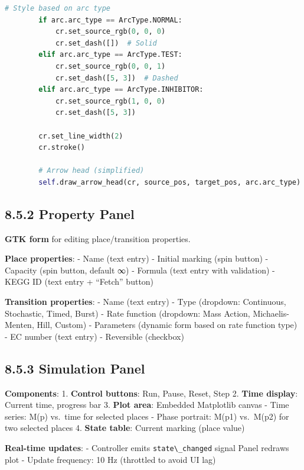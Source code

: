 \begin{lstlisting}[language=Python]
        # Style based on arc type
        if arc.arc_type == ArcType.NORMAL:
            cr.set_source_rgb(0, 0, 0)
            cr.set_dash([])  # Solid
        elif arc.arc_type == ArcType.TEST:
            cr.set_source_rgb(0, 0, 1)
            cr.set_dash([5, 3])  # Dashed
        elif arc.arc_type == ArcType.INHIBITOR:
            cr.set_source_rgb(1, 0, 0)
            cr.set_dash([5, 3])
        
        cr.set_line_width(2)
        cr.stroke()
        
        # Arrow head (simplified)
        self.draw_arrow_head(cr, source_pos, target_pos, arc.arc_type)
\end{lstlisting}

\hypertarget{property-panel}{%
\subsection{8.5.2 Property Panel}\label{property-panel}}

\textbf{GTK form} for editing place/transition properties.

\textbf{Place properties}: - Name (text entry) - Initial marking (spin
button) - Capacity (spin button, default ∞) - Formula (text entry with
validation) - KEGG ID (text entry + ``Fetch'' button)

\textbf{Transition properties}: - Name (text entry) - Type (dropdown:
Continuous, Stochastic, Timed, Burst) - Rate function (dropdown: Mass
Action, Michaelis-Menten, Hill, Custom) - Parameters (dynamic form based
on rate function type) - EC number (text entry) - Reversible (checkbox)

\hypertarget{simulation-panel}{%
\subsection{8.5.3 Simulation Panel}\label{simulation-panel}}

\textbf{Components}: 1. \textbf{Control buttons}: Run, Pause, Reset,
Step 2. \textbf{Time display}: Current time, progress bar 3.
\textbf{Plot area}: Embedded Matplotlib canvas - Time series: M(p)
vs.~time for selected places - Phase portrait: M(p1) vs.~M(p2) for two
selected places 4. \textbf{State table}: Current marking (place \textrightarrow value)

\textbf{Real-time updates}: - Controller emits
\passthrough{\lstinline!state\_changed!} signal \textrightarrow Panel redraws plot -
Update frequency: 10 Hz (throttled to avoid UI lag)

